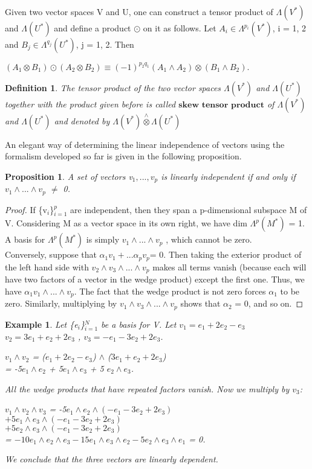 \documentclass[12pt,a4paper]{article}
\newtheorem{defn}[thm]{Definition}
\newtheorem{exmp}{Example}[section]
\newtheorem{prop}{Proposition}
\begin{document}
\indent Given two vector spaces V and U, one can construct a tensor product
of $\Lambda(V^*)$ and $\Lambda(U^*)$ and define a product $\odot$ on it as follows. Let $A_i \in \Lambda^{p_i}(V^*)$, i = 1, 2 and  $B_j \in \Lambda^{q_j}(U^*)$, j = 1, 2. Then \\
\begin{center}
$(A_1 \otimes B_1) \odot (A_2 \otimes B_2) \equiv (-1)^{p_2 q_1}(A_1 \wedge A_2) \otimes ( B_1 \wedge B_2). $
\end{center}
\begin{defn}
The tensor product of the two vector spaces $\Lambda(V^*)$ and $\Lambda(U^*)$ together with the product given before is called $\textbf{skew tensor product}$ of  $\Lambda(V^*)$ and $\Lambda(U^*)$ and denoted by  $\Lambda(V^*) \overset{\wedge}{\otimes} \Lambda(U^*)$
\end{defn}
An elegant way of determining the linear independence of vectors using
the formalism developed so far is given in the following proposition.\\
\begin{prop}\label{prop1}
A set of vectors v$_1,...,v_p$ is linearly independent if
and only if $v_1 \wedge ... \wedge v_p$ $\ne$ 0.
\end{prop}
\begin{proof}
If \{v$_i$\}$^p_{i=1}$ are independent, then they span a p-dimensional subspace M of V. Considering M as a vector space in its own right, we have
dim  $\Lambda^{p}(M^*)$ = 1. A basis for $\Lambda^{p}(M^*)$ is simply $v_1 \wedge ... \wedge v_p$ , which cannot
be zero. \\
\indent Conversely, suppose that $\alpha_1 v_1 + ... \alpha_p v_p $= 0. Then taking the exterior
product of the left hand side with $v_2 \wedge v_3 \wedge ... \wedge v_p$ makes all terms vanish (because
each will have two factors of a vector in the wedge product) except the first
one. Thus, we have $\alpha_1 v_1 \wedge ... \wedge v_p $.  The fact that the wedge product is
not zero forces $\alpha_1$ to be zero. Similarly, multiplying by $v_1 \wedge v_3 \wedge ... \wedge v_p$ shows that $\alpha_2$ = 0, and so on.
\end{proof}
\begin{exmp}
Let \{e$_i$\}$^N_{i=1}$ be a basis for V. Let $v_1 = e_1 + 2e_2 - e_3$ $v_2 = 3e_1 + e_2 + 2e_3$ , $v_3 = -e_1 - 3e_2 + 2 e_3$.
\begin{center}
$v_1 \wedge v_2$ = ($ e_1 + 2e_2 - e_3$) $\wedge$ ($3e_1 + e_2 + 2e_3$)\\
= -5$e_1 \wedge e_2$ + 5$e_1 \wedge e_3$ + 5 $e_2 \wedge e_3$.
\end{center}	
All the wedge products that have repeated factors vanish. Now we multiply
by $v_3$: 
\begin{center}
$v_1 \wedge v_2 \wedge v_3$ = -5$e_1 \wedge e_2 \wedge ( -e_1 - 3e_2 + 2e_3) $\\$+ 5e_1 \wedge e_3 \wedge ( -e_1 -3e_2 + 2e_3)  $\\$+5e_2 \wedge
e_3 \wedge (-e_1 - 3e_2 + 2e_3)$\\
= $-10e_1 \wedge e_2 \wedge e_3 - 15e_1 \wedge e_3 \wedge e_2 - 5e_2 \wedge e_3 \wedge e_1$ = 0.
\end{center}
We conclude that the three vectors are linearly dependent.
\end{exmp}
\end{document}
